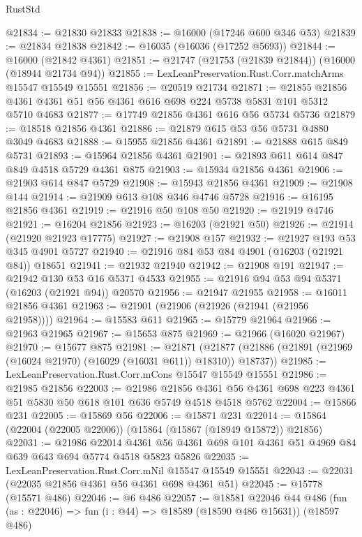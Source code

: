 \begin{lexlean}{RustStd}
\begin{coremodule}
@21834 := @21830 @21833
@21838 := @16000 (@17246 @600 @346 @53)
@21839 := @21834 @21838
@21842 := @16035 (@16036 (@17252 @5693))
@21844 := @16000 (@21842 @4361)
@21851 := @21747 (@21753 (@21839 @21844)) (@16000 (@18944 @21734 @94))
@21855 := LexLeanPreservation.Rust.Corr.matchArms @15547 @15549 @15551
@21856 := @20519 @21734
@21871 := @21855 @21856 @4361 @4361 @51 @56 @4361 @616 @698 @224 @5738 @5831 @101 @5312 @5710 @4683
@21877 := @17749 @21856 @4361 @616 @56 @5734 @5736
@21879 := @18518 @21856 @4361
@21886 := @21879 @615 @53 @56 @5731 @4880 @3049 @4683
@21888 := @15955 @21856 @4361
@21891 := @21888 @615 @849 @5731
@21893 := @15964 @21856 @4361
@21901 := @21893 @611 @614 @847 @849 @4518 @5729 @4361 @875
@21903 := @15934 @21856 @4361
@21906 := @21903 @614 @847 @5729
@21908 := @15943 @21856 @4361
@21909 := @21908 @144
@21914 := @21909 @613 @108 @346 @4746 @5728
@21916 := @16195 @21856 @4361
@21919 := @21916 @50 @108 @50
@21920 := @21919 @4746
@21921 := @16204 @21856
@21923 := @16203 (@21921 @50)
@21926 := @21914 (@21920 @21923 @17775)
@21927 := @21908 @157
@21932 := @21927 @193 @53 @345 @4901 @5727
@21940 := @21916 @84 @53 @84 @4901 (@16203 (@21921 @84)) @18651
@21941 := @21932 @21940
@21942 := @21908 @191
@21947 := @21942 @130 @53 @16 @5371 @4533
@21955 := @21916 @94 @53 @94 @5371 (@16203 (@21921 @94)) @20570
@21956 := @21947 @21955
@21958 := @16011 @21856 @4361
@21963 := @21901 (@21906 (@21926 (@21941 (@21956 @21958))))
@21964 := @15583 @611
@21965 := @15779 @21964
@21966 := @21963 @21965
@21967 := @15653 @875
@21969 := @21966 (@16020 @21967)
@21970 := @15677 @875
@21981 := @21871
    (@21877 (@21886 (@21891 (@21969 (@16024 @21970) (@16029 (@16031 @611)) @18310)) @18737))
@21985 := LexLeanPreservation.Rust.Corr.mCons @15547 @15549 @15551
@21986 := @21985 @21856
@22003 := @21986
    @21856
    @4361
    @56
    @4361
    @698
    @223
    @4361
    @51
    @5830
    @50
    @618
    @101
    @636
    @5749
    @4518
    @4518
    @5762
@22004 := @15866 @231
@22005 := @15869 @56
@22006 := @15871 @231
@22014 := @15864 (@22004 (@22005 @22006)) (@15864 (@15867 (@18949 @15872)) @21856)
@22031 := @21986
    @22014
    @4361
    @56
    @4361
    @698
    @101
    @4361
    @51
    @4969
    @84
    @639
    @643
    @694
    @5774
    @4518
    @5823
    @5826
@22035 := LexLeanPreservation.Rust.Corr.mNil @15547 @15549 @15551
@22043 := @22031 (@22035 @21856 @4361 @56 @4361 @698 @4361 @51)
@22045 := @15778 (@15571 @486)
@22046 := @6 @486
@22057 := @18581
    @22046
    @44
    @486
    (fun (as : @22046) => fun (i : @44) => @18589 (@18590 @486 @15631))
    (@18597 @486)

\end{coremodule}
\end{lexlean}
